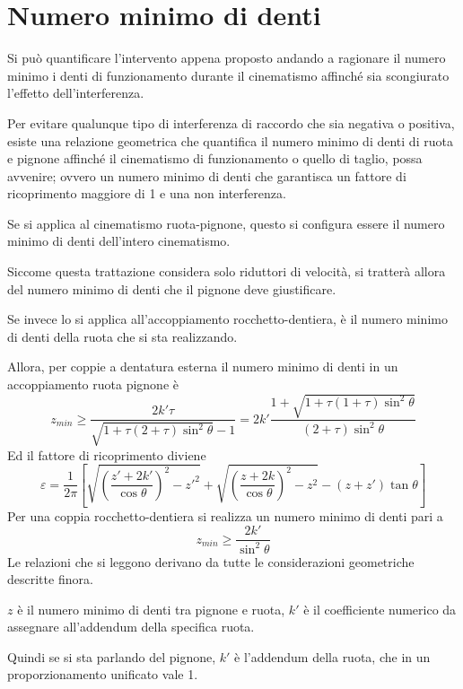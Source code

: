 \documentclass[a4paper, 15pt]{article}
\begin{document}
\section{Numero minimo di denti}		
\begin{adjustwidth}{2in}{} 
		Si può quantificare l'intervento appena proposto andando a ragionare il numero minimo i denti di funzionamento durante il cinematismo affinché sia scongiurato l'effetto dell'interferenza. \newline 
		
		Per evitare qualunque tipo di interferenza di raccordo che sia negativa o positiva, esiste una relazione geometrica che quantifica il numero minimo di denti di ruota e pignone affinché il cinematismo di funzionamento o quello di taglio, possa avvenire; ovvero un numero minimo di denti che garantisca un fattore di ricoprimento maggiore di 1 e una non interferenza. \newline 
		
		Se si applica al cinematismo ruota-pignone, questo si configura essere il numero minimo di denti dell'intero cinematismo.
		
		Siccome questa trattazione considera solo riduttori di velocità, si tratterà allora del numero minimo di denti che il pignone deve giustificare.
		
		Se invece lo si applica all'accoppiamento rocchetto-dentiera, è il numero minimo di denti della ruota che si sta realizzando.\newline 
		
		Allora, per coppie a dentatura esterna il numero minimo di denti in un accoppiamento ruota pignone è
		\[z_{min} \geq \dfrac{2k'\tau}{\sqrt{1+\tau(2+\tau)\sin^2\theta}-1} =2k' \dfrac{1+\sqrt{1+\tau(1+\tau)\sin^2\theta}}{(2+\tau)\sin^2\theta}\]
		Ed il fattore di ricoprimento diviene 
		\[\varepsilon = \dfrac{1}{2\pi}\left[\sqrt{\left(\dfrac{z'+ 2k'}{\cos\theta}\right)^2-z'^2} + \sqrt{\left(\dfrac{z+ 2k}{\cos\theta}\right)^2-z^2} -(z+z')\tan\theta \right]\]
		Per una coppia rocchetto-dentiera si realizza un numero minimo di denti pari a
		\[z_{min} \geq \dfrac{2k'}{\sin^2\theta}\]
\newpage		
		Le relazioni che si leggono derivano da tutte le considerazioni geometriche descritte finora. \newline 
		
		$z$ è il numero minimo di denti tra pignone e ruota, $k'$ è il coefficiente numerico da assegnare all'addendum della specifica ruota.
		
		Quindi se si sta parlando del pignone, $k'$ è l'addendum della ruota, che in un proporzionamento unificato vale 1. 
		

\end{adjustwidth}
\end{document}
